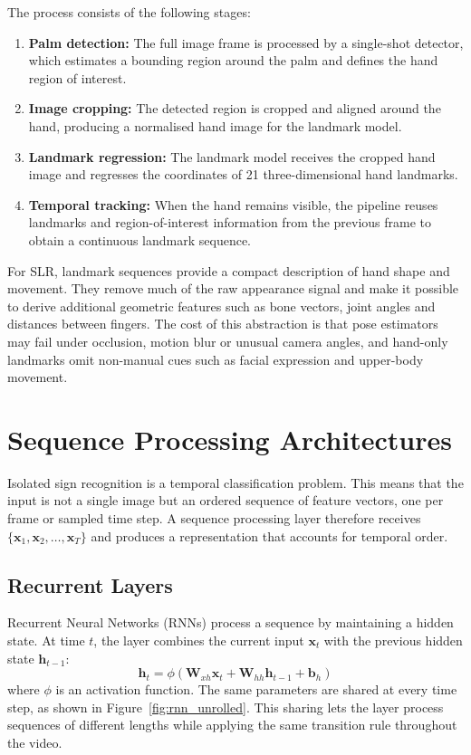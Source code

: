 The process consists of the following stages:
\begin{enumerate}
    \item \textbf{Palm detection:} The full image frame is processed by a single-shot detector, which
          estimates a bounding region around the palm and defines the hand region of interest.
    \item \textbf{Image cropping:} The detected region is cropped and aligned around the hand,
          producing a normalised hand image for the landmark model.
    \item \textbf{Landmark regression:} The landmark model receives the cropped hand image and
          regresses the coordinates of 21 three-dimensional hand landmarks.
    \item \textbf{Temporal tracking:} When the hand remains visible, the pipeline reuses landmarks and
          region-of-interest information from the previous frame to obtain a continuous landmark
          sequence.
\end{enumerate}

For SLR, landmark sequences provide a compact description of hand shape and movement. They remove
much of the raw appearance signal and make it possible to derive additional geometric features such
as bone vectors, joint angles and distances between fingers. The cost of this abstraction is that
pose estimators may fail under occlusion, motion blur or unusual camera angles, and hand-only
landmarks omit non-manual cues such as facial expression and upper-body movement.

\section{Sequence Processing Architectures}
\label{sec:sequence_processing_architectures}

Isolated sign recognition is a temporal classification problem. This means that the input is not a
single image but an ordered sequence of feature vectors, one per frame or sampled time step. A
sequence processing layer therefore receives $\{\mathbf{x}_1,\mathbf{x}_2,\ldots,\mathbf{x}_T\}$
and produces a representation that accounts for temporal order.

\subsection{Recurrent Layers}

Recurrent Neural Networks (RNNs) process a sequence by maintaining a hidden state. At time $t$, the
layer combines the current input $\mathbf{x}_t$ with the previous hidden state $\mathbf{h}_{t-1}$:
\begin{equation}
    \mathbf{h}_t =
    \phi(\mathbf{W}_{xh}\mathbf{x}_t + \mathbf{W}_{hh}\mathbf{h}_{t-1} + \mathbf{b}_h)
\end{equation}
where $\phi$ is an activation function. The same parameters are shared at every time step, as shown
in Figure~\ref{fig:rnn_unrolled}. This sharing lets the layer process sequences of different
lengths while applying the same transition rule throughout the video.


